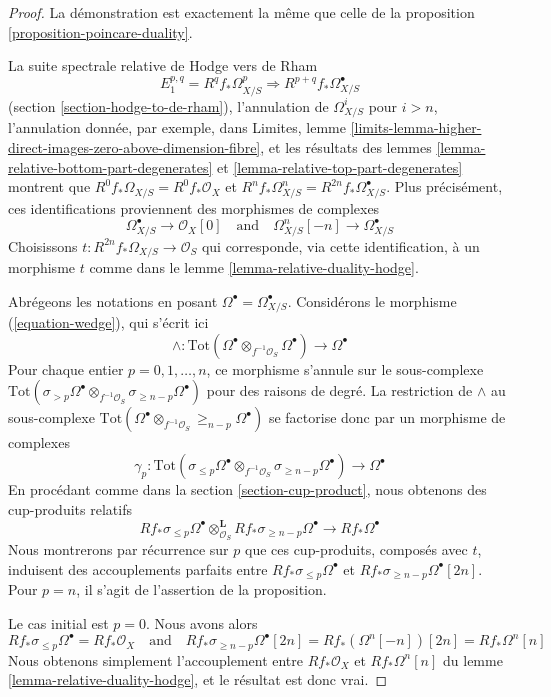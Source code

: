 \begin{proof}
La démonstration est exactement la même que celle de la
proposition \ref{proposition-poincare-duality}.

\medskip\noindent
La suite spectrale relative de Hodge vers de Rham
$$
E_1^{p, q} = R^qf_*\Omega^p_{X/S} \Rightarrow R^{p + q}f_*\Omega^\bullet_{X/S}
$$
(section \ref{section-hodge-to-de-rham}), l'annulation
de $\Omega^i_{X/S}$ pour $i > n$, l'annulation donnée, par exemple, dans Limites, lemme
\ref{limits-lemma-higher-direct-images-zero-above-dimension-fibre},
et les résultats des lemmes \ref{lemma-relative-bottom-part-degenerates} et
\ref{lemma-relative-top-part-degenerates}
montrent que $R^0f_*\Omega_{X/S} = R^0f_*\mathcal{O}_X$
et $R^nf_*\Omega^n_{X/S} = R^{2n}f_*\Omega^\bullet_{X/S}$.
Plus précisément, ces identifications proviennent des morphismes
de complexes
$$
\Omega^\bullet_{X/S} \to \mathcal{O}_X[0]
\quad\text{and}\quad
\Omega^n_{X/S}[-n] \to \Omega^\bullet_{X/S}
$$
Choisissons $t : R^{2n}f_*\Omega_{X/S} \to \mathcal{O}_S$
qui corresponde, via cette identification, à un morphisme $t$ comme dans le
lemme \ref{lemma-relative-duality-hodge}.

\medskip\noindent
Abrégeons les notations en posant $\Omega^\bullet = \Omega^\bullet_{X/S}$.
Considérons le morphisme (\ref{equation-wedge}), qui s'écrit ici
$$
\wedge :
\text{Tot}(\Omega^\bullet \otimes_{f^{-1}\mathcal{O}_S} \Omega^\bullet)
\longrightarrow
\Omega^\bullet
$$
Pour chaque entier $p = 0, 1, \ldots, n$, ce morphisme s'annule sur le sous-complexe
$\text{Tot}(\sigma_{> p} \Omega^\bullet \otimes_{f^{-1}\mathcal{O}_S}
\sigma_{\geq n - p} \Omega^\bullet)$ pour des raisons de degré.
La restriction de $\wedge$ au sous-complexe
$\text{Tot}(\Omega^\bullet \otimes_{f^{-1}\mathcal{O}_S}
\geq_{n - p}\Omega^\bullet)$ se factorise donc par un morphisme de complexes
$$
\gamma_p :
\text{Tot}(\sigma_{\leq p} \Omega^\bullet \otimes_{f^{-1}\mathcal{O}_S}
\sigma_{\geq n - p} \Omega^\bullet)
\longrightarrow
\Omega^\bullet
$$
En procédant comme dans la section \ref{section-cup-product}, nous obtenons
des cup-produits relatifs
$$
Rf_*\sigma_{\leq p} \Omega^\bullet
\otimes_{\mathcal{O}_S}^\mathbf{L}
Rf_*\sigma_{\geq n - p}\Omega^\bullet
\longrightarrow
Rf_*\Omega^\bullet
$$
Nous montrerons par récurrence sur $p$ que ces cup-produits, composés avec $t$,
induisent des accouplements parfaits entre $Rf_*\sigma_{\leq p} \Omega^\bullet$
et $Rf_*\sigma_{\geq n - p}\Omega^\bullet[2n]$. Pour $p = n$,
il s'agit de l'assertion de la proposition.

\medskip\noindent
Le cas initial est $p = 0$. Nous avons alors
$$
Rf_*\sigma_{\leq p}\Omega^\bullet = Rf_*\mathcal{O}_X
\quad\text{and}\quad
Rf_*\sigma_{\geq n - p}\Omega^\bullet[2n] = Rf_*(\Omega^n[-n])[2n] =
Rf_*\Omega^n[n]
$$
Nous obtenons simplement l'accouplement
entre $Rf_*\mathcal{O}_X$ et $Rf_*\Omega^n[n]$ du
lemme \ref{lemma-relative-duality-hodge}, et le résultat est donc vrai.


\end{proof}
